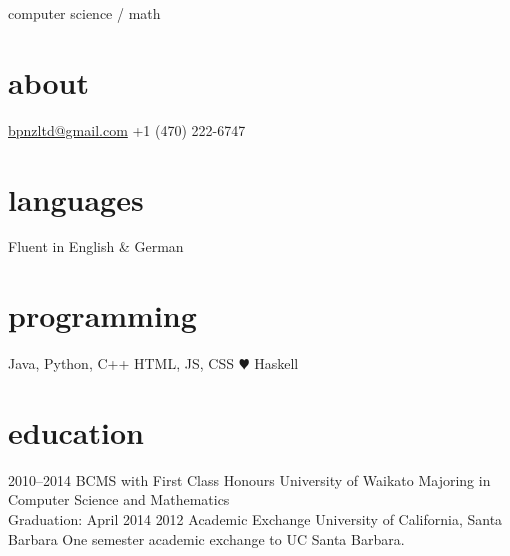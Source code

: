 \documentclass[]{boris-cv}
\begin{document}
       {computer science / math}

\begin{aside}
  \section{about}
    \href{mailto:bpnzltd@gmail.com}{bpnzltd@gmail.com}
    +1 (470) 222-6747
  \section{languages}
    Fluent in
    English \& German
  \section{programming}
    Java, Python, C++
    HTML, JS, CSS
    {\color{red} $\varheartsuit$} Haskell
\end{aside}

%
%
%
\section{education}

\begin{entrylist}
  \entry
    {2010--2014}
    {BCMS with First Class Honours }
    {University of Waikato}
    {Majoring in Computer Science and Mathematics\\Graduation: April 2014}
  \entry
    {2012}
    {Academic Exchange}
    {University of California, Santa Barbara}
    {One semester academic exchange to UC Santa Barbara.}
\end{entrylist}
\end{document}
